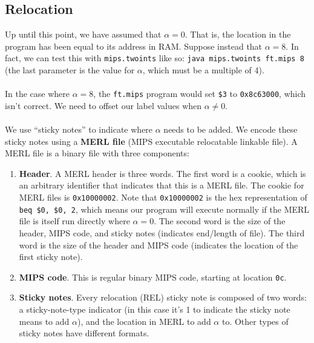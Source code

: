 \documentclass[]{article}
\theoremstyle{definition}
\begin{document}
		\subsection{Relocation}
			Up until this point, we have assumed that $\alpha = 0$. That is, the location in the program has been equal to its address in RAM. Suppose instead that $\alpha = 8$. In fact, we can test this with \verb+mips.twoints+ like so: \verb+java mips.twoints ft.mips 8+ (the last parameter is the value for $\alpha$, which must be a multiple of 4).
			\\ \\
			In the case where $\alpha = 8$, the \verb+ft.mips+ program would set \verb+$3+ to \verb+0x8c63000+, which isn't correct. We need to offset our label values when $\alpha \not = 0$.
			\\ \\
			We use ``sticky notes'' to indicate where $\alpha$ needs to be added. We encode these sticky notes using a \textbf{MERL file} (MIPS executable relocatable linkable file). A MERL file is a binary file with three components:
			\begin{enumerate}
				\item \textbf{Header}. A MERL header is three words. The first word is a cookie, which is an arbitrary identifier that indicates that this is a MERL file. The cookie for MERL files is \verb+0x10000002+. Note that \verb+0x10000002+ is the hex representation of \verb+beq $0, $0, 2+, which means our program will execute normally if the MERL file is itself run directly where $\alpha = 0$. The second word is the size of the header, MIPS code, and sticky notes (indicates end/length of file). The third word is the size of the header and MIPS code (indicates the location of the first sticky note).
				\item \textbf{MIPS code}. This is regular binary MIPS code, starting at location \verb+0c+.
				\item \textbf{Sticky notes}. Every relocation (REL) sticky note is composed of two words: a sticky-note-type indicator (in this case it's 1 to indicate the sticky note means to add $\alpha$), and the location in MERL to add $\alpha$ to. Other types of sticky notes have different formats.
			\end{enumerate}
\end{document}
